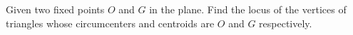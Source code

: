 Given two fixed points $O$ and $G$ in the plane. Find the locus of the vertices of triangles whose circumcenters and centroids are $O$ and $G$ respectively.